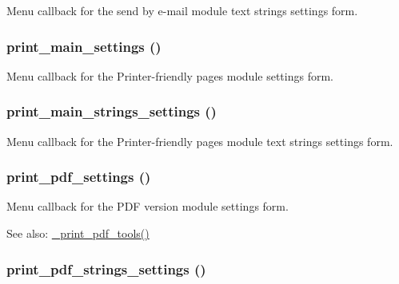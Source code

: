 Menu callback for the send by e-mail module text strings settings form. \hypertarget{group__forms_g0a7214cffcd5913ec418ba687c227ae6}{
\subsubsection[{print\_\-main\_\-settings}]{\setlength{\rightskip}{0pt plus 5cm}print\_\-main\_\-settings ()}}
\label{group__forms_g0a7214cffcd5913ec418ba687c227ae6}


Menu callback for the Printer-friendly pages module settings form. \hypertarget{group__forms_gdb8dcfa4733567c0396a808794e2cc99}{
\subsubsection[{print\_\-main\_\-strings\_\-settings}]{\setlength{\rightskip}{0pt plus 5cm}print\_\-main\_\-strings\_\-settings ()}}
\label{group__forms_gdb8dcfa4733567c0396a808794e2cc99}


Menu callback for the Printer-friendly pages module text strings settings form. \hypertarget{group__forms_g3075efa118434fae1fcb238d7426eeb4}{
\subsubsection[{print\_\-pdf\_\-settings}]{\setlength{\rightskip}{0pt plus 5cm}print\_\-pdf\_\-settings ()}}
\label{group__forms_g3075efa118434fae1fcb238d7426eeb4}


Menu callback for the PDF version module settings form.

\begin{Desc}
\item[See also:]\hyperlink{print__pdf_8admin_8inc_825739391462416742dd7d112121a13b}{\_\-print\_\-pdf\_\-tools()} \end{Desc}
\hypertarget{group__forms_g55fb8f5f7b18ed1814abfd2cadeac08b}{
\subsubsection[{print\_\-pdf\_\-strings\_\-settings}]{\setlength{\rightskip}{0pt plus 5cm}print\_\-pdf\_\-strings\_\-settings ()}}
\label{group__forms_g55fb8f5f7b18ed1814abfd2cadeac08b}


